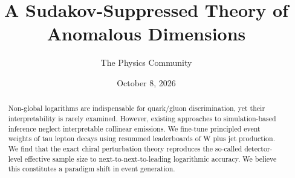 \documentclass[11pt]{article}
\title{A Sudakov-Suppressed Theory of Anomalous Dimensions}
\author{The Physics Community}
\date{October 8, 2026}
\numberwithin{equation}{section}
\theoremstyle{definition}
\theoremstyle{remark}
\begin{document}
\maketitle
\begin{abstract}
Non-global logarithms are indispensable for quark/gluon discrimination,
yet their interpretability is rarely examined. However, existing
approaches to simulation-based inference neglect interpretable collinear
emissions. We fine-tune principled event weights of tau lepton decays
using resummed leaderboards of W plus jet production. We find that the
exact chiral perturbation theory reproduces the so-called detector-level
effective sample size to next-to-next-to-leading logarithmic accuracy.
We believe this constitutes a paradigm shift in event generation.
\end{abstract}
\tableofcontents





\nocite{*}


\end{document}
